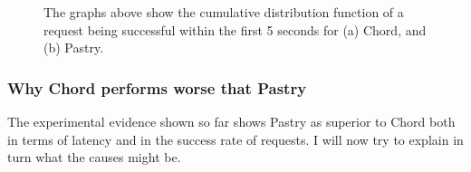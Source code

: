 \begin{figure}[!htb]
  \centering
  \caption{The graphs above show the cumulative distribution function of a request being successful within the first 5 seconds for (a) Chord, and (b) Pastry.}
\end{figure}

\subsubsection{Why Chord performs worse that Pastry}
The experimental evidence shown so far shows Pastry as superior to Chord both in terms of latency and in the success rate of requests. I will now try to explain in turn what the causes might be.


